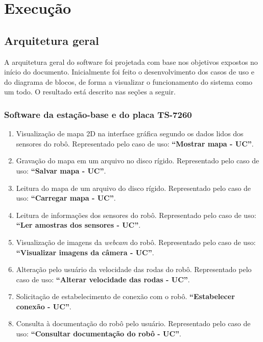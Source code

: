 \chapter{Execução}
\section{Arquitetura geral}
A arquitetura geral do software foi projetada com base nos objetivos expostos no início do documento. Inicialmente foi feito o desenvolvimento dos casos de uso e do diagrama de blocos, de forma a visualizar o funcionamento do sistema como um todo. O resultado está descrito nas seções a seguir.

\subsection{Software da estação-base e do placa TS-7260}

\begin{enumerate}[topsep=0pt, partopsep=0pt, itemsep=0pt]
  \item Visualização de mapa 2D na interface gráfica segundo os dados lidos dos sensores do robô. Representado pelo caso de uso: \textbf{``Mostrar mapa - UC''}.
  \item Gravação do mapa em um arquivo no disco rígido. Representado pelo caso de uso: \textbf{``Salvar mapa - UC''}. 
  \item Leitura do mapa de um arquivo do disco rígido. Representado pelo caso de uso: \textbf{``Carregar mapa - UC''}.
  \item Leitura de informações dos sensores do robô. Representado pelo caso de uso: \textbf{``Ler amostras dos sensores - UC''}.
  \item Visualização de imagens da \textit{webcam} do robô. Representado pelo caso de uso: \textbf{``Visualizar imagens da câmera - UC''}.
  \item Alteração pelo usuário da velocidade das rodas do robô. Representado pelo caso de uso: \textbf{``Alterar velocidade das rodas - UC''}.
  \item Solicitação de estabelecimento de conexão com o robô. \textbf{``Estabelecer conexão - UC''}.
  \item Consulta à documentação do robô pelo usuário. Representado pelo caso de uso: \textbf{``Consultar documentação do robô - UC''}.
\end{enumerate}

